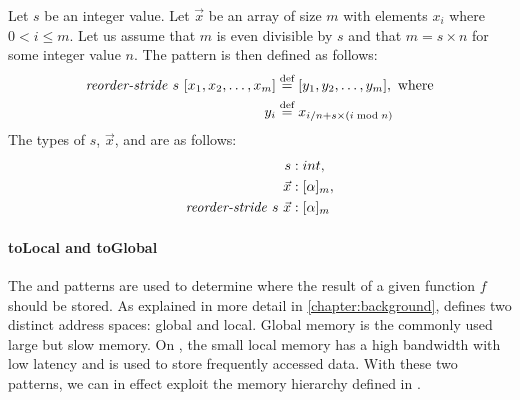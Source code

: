 \begin{definition}
  \label{definition:pattern:reorderStride}
  Let $s$ be an integer value.
  Let $\vec{x}$ be an array of size $m$ with elements $x_i$ where $0 < i \leq m$.
  Let us assume that $m$ is even divisible by $s$ and that $m = s\times n$ for some integer value $n$.
  The \reorderStride pattern is then defined as follows:
  \begin{align*}
    \text{\textit{reorder-stride}}\ s\ [x_1, x_2, \dots, x_m] &\stackrel{\textrm{\scriptsize def}}{=} [y_1, y_2, \dots, y_m], \text{ where}\\
    y_i &\stackrel{\textrm{\scriptsize def}}{=} x_{i / n + s \times (i \bmod{n})}
  \end{align*}
  The types of $s$, $\vec{x}$, and \reorderStride are as follows:
  \begin{align*}
    s &: int,\\
    \vec{x} &: [\alpha]_m,\\
    \text{\textit{reorder-stride}}\ s\ \vec{x} &: [\alpha]_m
  \end{align*}
\end{definition}

{}


\paragraph{{\footnotesize to}Local and {\footnotesize to}Global}
The \toLocal and \toGlobal patterns are used to determine where the result of a given function $f$ should be stored.
As explained in more detail in \autoref{chapter:background}, \OpenCL defines two distinct address spaces: global and local.
Global memory is the commonly used large but slow memory.
On \GPUs, the small local memory has a high bandwidth with low latency and is used to store frequently accessed data.
With these two patterns, we can in effect exploit the memory hierarchy defined in \OpenCL.

